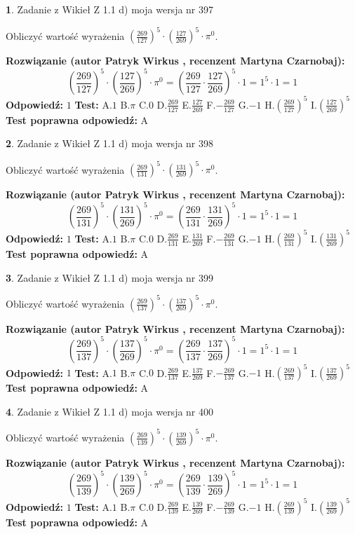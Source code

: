 \documentclass[12pt, a4paper]{article}
\theoremstyle{definition} %
\newtheorem{zad}{}
\newcommand{\zadStart}[1]{\begin{zad}#1\newline}
\newcommand{\zadStop}{\end{zad}}
\newcommand{\rozwStart}[2]{\noindent \textbf{Rozwiązanie (autor #1 , recenzent #2): }\newline}
\newcommand{\rozwStop}{\newline}
\newcommand{\odpStart}{\noindent \textbf{Odpowiedź:}\newline}
\newcommand{\odpStop}{\newline}
\newcommand{\testStart}{\noindent \textbf{Test:}\newline}
\newcommand{\testStop}{\newline}
\newcommand{\kluczStart}{\noindent \textbf{Test poprawna odpowiedź:}\newline}
\newcommand{\kluczStop}{\newline}
\begin{document}
\zadStart{Zadanie z Wikieł Z 1.1 d) moja wersja nr 397}

Obliczyć wartość wyrażenia $(\frac{269}{127})^{5} \cdot (\frac{127}{269})^{5} \cdot \pi^{0}$.
\zadStop
\rozwStart{Patryk Wirkus}{Martyna Czarnobaj}
$$(\frac{269}{127})^{5} \cdot (\frac{127}{269})^{5} \cdot \pi^{0} = (\frac{269}{127} \cdot \frac{127}{269})^{5} \cdot 1 = 1^{5} \cdot 1 = 1$$
\rozwStop
\odpStart
$1$
\odpStop
\testStart
A.$1$ B.$\pi$ C.$0$ D.$\frac{269}{127}$ E.$\frac{127}{269}$
F.$-\frac{269}{127}$ G.$-1$
H.$(\frac{269}{127})^{5}$
I.$(\frac{127}{269})^{5}$
\testStop
\kluczStart
A
\kluczStop



\zadStart{Zadanie z Wikieł Z 1.1 d) moja wersja nr 398}

Obliczyć wartość wyrażenia $(\frac{269}{131})^{5} \cdot (\frac{131}{269})^{5} \cdot \pi^{0}$.
\zadStop
\rozwStart{Patryk Wirkus}{Martyna Czarnobaj}
$$(\frac{269}{131})^{5} \cdot (\frac{131}{269})^{5} \cdot \pi^{0} = (\frac{269}{131} \cdot \frac{131}{269})^{5} \cdot 1 = 1^{5} \cdot 1 = 1$$
\rozwStop
\odpStart
$1$
\odpStop
\testStart
A.$1$ B.$\pi$ C.$0$ D.$\frac{269}{131}$ E.$\frac{131}{269}$
F.$-\frac{269}{131}$ G.$-1$
H.$(\frac{269}{131})^{5}$
I.$(\frac{131}{269})^{5}$
\testStop
\kluczStart
A
\kluczStop



\zadStart{Zadanie z Wikieł Z 1.1 d) moja wersja nr 399}

Obliczyć wartość wyrażenia $(\frac{269}{137})^{5} \cdot (\frac{137}{269})^{5} \cdot \pi^{0}$.
\zadStop
\rozwStart{Patryk Wirkus}{Martyna Czarnobaj}
$$(\frac{269}{137})^{5} \cdot (\frac{137}{269})^{5} \cdot \pi^{0} = (\frac{269}{137} \cdot \frac{137}{269})^{5} \cdot 1 = 1^{5} \cdot 1 = 1$$
\rozwStop
\odpStart
$1$
\odpStop
\testStart
A.$1$ B.$\pi$ C.$0$ D.$\frac{269}{137}$ E.$\frac{137}{269}$
F.$-\frac{269}{137}$ G.$-1$
H.$(\frac{269}{137})^{5}$
I.$(\frac{137}{269})^{5}$
\testStop
\kluczStart
A
\kluczStop



\zadStart{Zadanie z Wikieł Z 1.1 d) moja wersja nr 400}

Obliczyć wartość wyrażenia $(\frac{269}{139})^{5} \cdot (\frac{139}{269})^{5} \cdot \pi^{0}$.
\zadStop
\rozwStart{Patryk Wirkus}{Martyna Czarnobaj}
$$(\frac{269}{139})^{5} \cdot (\frac{139}{269})^{5} \cdot \pi^{0} = (\frac{269}{139} \cdot \frac{139}{269})^{5} \cdot 1 = 1^{5} \cdot 1 = 1$$
\rozwStop
\odpStart
$1$
\odpStop
\testStart
A.$1$ B.$\pi$ C.$0$ D.$\frac{269}{139}$ E.$\frac{139}{269}$
F.$-\frac{269}{139}$ G.$-1$
H.$(\frac{269}{139})^{5}$
I.$(\frac{139}{269})^{5}$
\testStop
\kluczStart
A
\kluczStop
\end{document}
